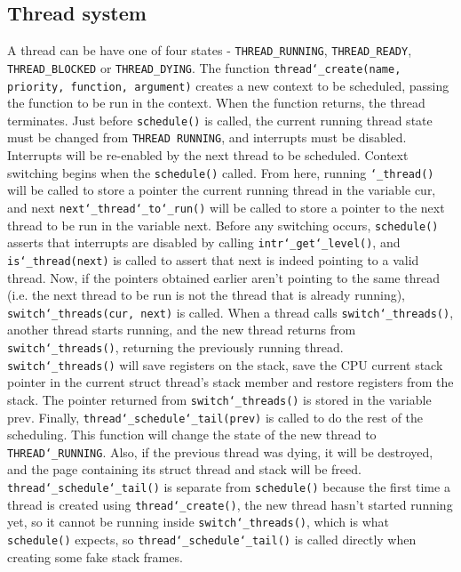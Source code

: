 \documentclass{article}
\renewcommand{\_}{\char`_}
\begin{document}
\subsection{Thread system}
A thread can be have one of four states - \texttt{THREAD_RUNNING}, \texttt{THREAD_READY}, \texttt{THREAD_BLOCKED} or \texttt{THREAD_DYING}. The function \texttt{thread\char`_create(name, priority, function, argument)} creates a new context to be scheduled, 
passing the function to be run in the context. When the function returns, the thread terminates. 
Just before \texttt{schedule()} is called, the current running thread state must be changed from 
\texttt{THREAD RUNNING}, and interrupts must be disabled. Interrupts will be re-enabled by the next 
thread to be scheduled. Context switching begins when the \texttt{schedule()} called. From here, 
running \texttt{\_thread()} will be called to store a pointer the current running thread in the variable cur, 
and next \texttt{next\_thread\_to\_run()} will be called to store a pointer to the next thread to be run in the
variable next. Before any switching occurs, \texttt{schedule()} asserts that interrupts are disabled by calling 
\texttt{intr\_get\_level()}, and \texttt{is\_thread(next)} is called to assert that next is indeed pointing to a valid thread. 
Now, if the pointers obtained earlier aren’t pointing to the same thread (i.e. the next thread to be run 
is not the thread that is already running), \texttt{switch\_threads(cur, next)} is called. When a thread calls 
\texttt{switch\_threads()}, another thread starts running, and the new thread returns from \texttt{switch\_threads()}, 
returning the previously running thread. \texttt{switch\_threads()} will save registers on the stack, save 
the CPU current stack pointer in the current struct thread’s stack member and restore registers 
from the stack. The pointer returned from \texttt{switch\_threads()} is stored in the variable prev. Finally, 
\texttt{thread\_schedule\_tail(prev)} is called to do the rest of the scheduling. This function will change the 
state of the new thread to \texttt{THREAD\_RUNNING}. Also, if the previous thread was dying, it will be 
destroyed, and the page containing its struct thread and stack will be freed. \texttt{thread\_schedule\_tail()}
is separate from \texttt{schedule()} because the first time a thread is created using \texttt{thread\_create()}, the 
new thread hasn’t started running yet, so it cannot be running inside \texttt{switch\_threads()}, which is what 
\texttt{schedule()} expects, so \texttt{thread\_schedule\_tail()} is called directly when creating some fake stack frames. 
\end{document}
